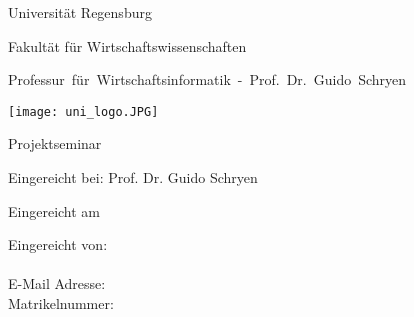 %
%
%

\thispagestyle{empty}
\begin{titlepage}


\begin{adjustwidth}{-2cm}{}


\renewcommand{\thepage}{}

\begin{center}

\large{Universität Regensburg\\}

\large{Fakultät für Wirtschaftswissenschaften\\}

\large{\mbox{Professur für Wirtschaftsinformatik - Prof. Dr. Guido Schryen}}

\vspace*{10mm}

\Large{\textbf{\titelthema}}

\vspace*{15mm}
\texttt{[image: uni\_logo.JPG]}
\vspace*{15mm}

\Large{Projektseminar}

\vspace*{10mm}



\Large{Eingereicht bei: Prof. Dr. Guido Schryen\\}


\vspace*{5mm}

\large{Eingereicht am \abgabedatum\\}

\end{center}

\vfill

\begin{center}
\end{center}
\vspace*{6mm}
\begin{flushleft}
Eingereicht von:\\
\vspace*{7pt}
\authorname\\
E-Mail Adresse: \authormail\\
Matrikelnummer: \matrikelnr\\




\end{flushleft}

\end{adjustwidth}

\end{titlepage}

\newpage

